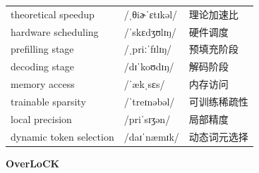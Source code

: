 \documentclass[UTF8,12pt,a4paper]{ctexart}
\providecommand{\zh}[1]{#1}
\begin{document}
\begin{tabular*}{\textwidth}{@{\extracolsep{\fill}}lll@{}}
theoretical speedup & {\ipafont /ˌθiɚˈɛtɪkəl/} & \zh{理论加速比} \\
hardware scheduling & {\ipafont /ˈskɛdʒʊlɪŋ/} & \zh{硬件调度} \\
prefilling stage & {\ipafont /ˌpriːˈfɪlɪŋ/} & \zh{预填充阶段} \\
decoding stage & {\ipafont /dɪˈkoʊdɪŋ/} & \zh{解码阶段} \\
memory access & {\ipafont /ˈækˌsɛs/} & \zh{内存访问} \\
trainable sparsity & {\ipafont /ˈtreɪnəbəl/} & \zh{可训练稀疏性} \\
local precision & {\ipafont /priˈsɪʒən/} & \zh{局部精度} \\
dynamic token selection & {\ipafont /daɪˈnæmɪk/} & \zh{动态词元选择} \\
\bottomrule
\end{tabular*}


\newpage

\begin{center}
    {\Large\bfseries OverLoCK}
\end{center}
\end{document}
